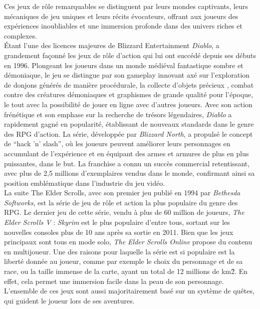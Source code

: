 \vspace{0.5cm}

Ces jeux de rôle remarquables se distinguent par leurs mondes captivants, leurs mécaniques de jeu uniques et leurs récits évocateurs, offrant aux joueurs des expériences inoubliables et une immersion profonde dans des univers riches et complexes. 
\\

Étant l’une des licences majeures de Blizzard Entertainment \textit{Diablo}, a grandement façonné les jeux de rôle d'action qui lui ont succédé depuis ses débuts en 1996. 
Plongeant les joueurs dans un monde médiéval fantastique sombre et démoniaque, le jeu se distingue par son gameplay innovant axé sur l'exploration de donjons générés de manière procédurale, la collecte d'objets précieux , combat contre des créatures démoniaques et graphismes de grande qualité pour l’époque, le tout avec la possibilité de jouer en ligne avec d’autres joueurs. 
Avec son action frénétique et son emphase sur la recherche de trésors légendaires, \textit{Diablo} a rapidement gagné en popularité, établissant de nouveaux standards dans le genre des RPG d'action. 
La série, développée par \textit{Blizzard North}, a propulsé le concept de “hack 'n' slash”, où les joueurs peuvent améliorer leurs personnages en accumulant de l'expérience et en équipant des armes et armures de plus en plus puissantes, dans le but. 
La franchise a connu un succès commercial retentissant, avec plus de 2,5 millions d'exemplaires vendus dans le monde, confirmant ainsi sa position emblématique dans l'industrie du jeu vidéo.
\\

La suite The Elder Scrolls, avec son premier jeu publié en 1994 par \textit{Bethesda Softworks}, est la série de jeu de rôle et action la plus populaire du genre des RPG. 
Le dernier jeu de cette série, vendu à plus de 60 million de joueurs, \textit{The Elder Scrolls V} : \textit{Skyrim} est le plus populaire d'entre tous, sortant sur les nouvelles consoles plus de 10 ans après sa sortie en 2011. 
Bien que les jeux principaux sont tous en mode solo, \textit{The Elder Scrolls Online} propose du contenu en multijoueur. 
Une des raisons pour laquelle la série est si populaire est la liberté donnée au joueur, comme par exemple le choix du personnage et de sa race, ou la taille immense de la carte, ayant un total de 12 millions de km\^{2}. 
En effet, cela permet une immersion facile dans la peau de son personnage. 
L'ensemble de ces jeux sont aussi majoritairement basé sur un système de quêtes, qui guident le joueur lors de ses aventures.
\\

